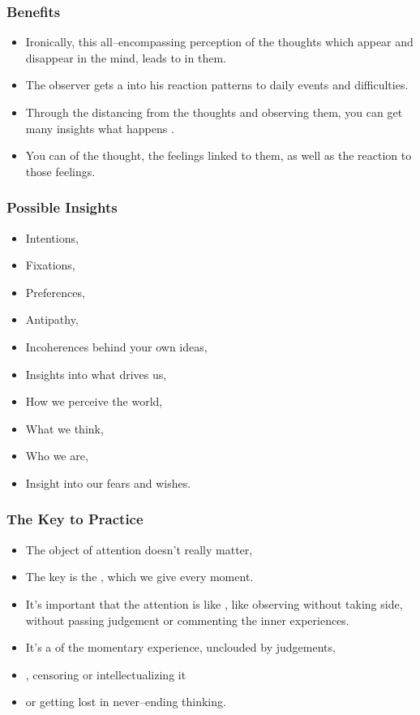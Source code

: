 \begin{frame}
\frametitle{Benefits}
\begin{itemize}
\item Ironically, this all--encompassing perception of the thoughts which appear and disappear in the mind, leads to  in them.
\item The observer gets a  into his reaction patterns to daily events and difficulties.
\item Through the distancing from the thoughts and observing them, you can get many insights what happens .
\item You can  of the thought, the feelings linked to them, as well as the reaction to those feelings.
\end{itemize}
\end{frame}
\begin{frame}
\frametitle{Possible Insights}
\begin{itemize}
\item Intentions,
\item Fixations,
\item Preferences,
\item Antipathy,
\item Incoherences behind your own ideas,
\item Insights into what drives us,
\item How we perceive the world,
\item What we think,
\item Who we are,
\item Insight into our fears and wishes.
\end{itemize}
\end{frame}

\begin{frame}
\frametitle{The Key to Practice}
\begin{itemize}
\item The object of attention doesn't really matter,
\item The key is the , which we give every moment.
\item It's important that the attention is like , 
like observing without taking side, 
without passing judgement
or commenting the inner experiences.
\item It's a   of the momentary experience, unclouded by judgements,
\item {}, censoring or intellectualizing it
\item or getting lost in never--ending thinking.
\end{itemize}
\end{frame}

